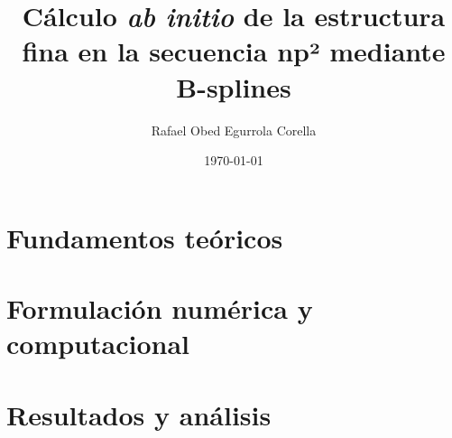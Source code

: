 \documentclass[11pt, a4paper, oneside, spanish]{book}
\title{\textbf{Cálculo \textit{ab initio} de la estructura fina en la secuencia np² mediante B-splines}}
\author{Rafael Obed Egurrola Corella}
\date{\today}
\begin{document}
\frontmatter
\maketitle

\tableofcontents
\listoffigures
\listoftables

\mainmatter




\part{Fundamentos teóricos}
\label{part:fundamentos}




\part{Formulación numérica y computacional}
\label{part:numerica}




\part{Resultados y análisis}
\label{part:resultados}




\appendix










\backmatter
{\setlength{\emergencystretch}{2em}\printbibliography[heading=bibintoc]}
\end{document}
